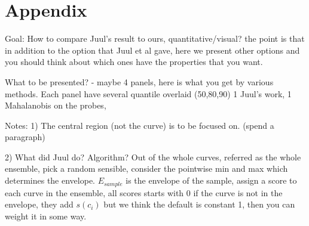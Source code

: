 \documentclass[12pt]{article}
\theoremstyle{definition} %
\begin{document}




\section{Appendix}


Goal: 
 How to compare Juul's result to ours, quantitative/visual? the point is that in addition to the option that Juul et al gave, here we present other options and you should think about which ones have the properties that you want.
 
What to be presented? 
- maybe 4 panels, here is what you get by various methods. Each panel have several quantile overlaid (50,80,90) 1 Juul's work, 1 Mahalanobis on the probes,  

Notes:
1) The central region (not the curve) is to be focused on. (spend a paragraph) 

2) What did Juul do? Algorithm? 
Out of the whole curves, referred as the whole ensemble, pick a random sensible, consider the pointwise min and max which determines the envelope. $E_{sample}$ is the envelope of the sample, assign a score to each curve in the ensemble, all scores starts with 0 if the curve is not in the envelope, they add $s(c_i)$ but we think the default is constant 1, then you can weight it in some way. 
\end{document}
